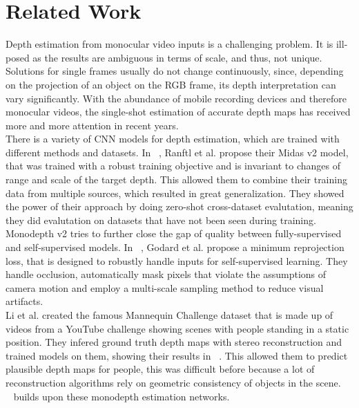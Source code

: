 \chapter{Related Work}
    Depth estimation from monocular video inputs is a challenging problem.
    It is ill-posed as the results are ambiguous in terms of scale, and thus, not unique.
    Solutions for single frames usually do not change continuously, since, depending on the projection of an object on the RGB frame, its depth interpretation can vary significantly.
    With the abundance of mobile recording devices and therefore monocular videos, the single-shot estimation of accurate depth maps has received more and more attention in recent years.\\
    There is a variety of CNN models for depth estimation, which are trained with different methods and datasets.
    In ~\cite{ranftl2020robust}, Ranftl et al. propose their Midas v2 model, that was trained with a robust training objective and is invariant to changes of range and scale of the target depth.
    This allowed them to combine their training data from multiple sources, which resulted in great generalization.
    They showed the power of their approach by doing zero-shot cross-dataset evalutation, meaning they did evalutation on datasets that have not been seen during training.\\
    Monodepth v2 tries to further close the gap of quality between fully-supervised and self-supervised models.
    In ~\cite{godard2019digging}, Godard et al. propose a minimum reprojection loss, that is designed to robustly handle inputs for self-supervised learning.
    They handle occlusion, automatically mask pixels that violate the assumptions of camera motion and employ a multi-scale sampling method to reduce visual artifacts.\\
    Li et al. created the famous Mannequin Challenge dataset that is made up of videos from a YouTube challenge showing scenes with people standing in a static position.
    They infered ground truth depth maps with stereo reconstruction and trained models on them, showing their results in ~\cite{mannequin}.
    This allowed them to predict plausible depth maps for people, this was difficult before because a lot of reconstruction algorithms rely on geometric consistency of objects in the scene.\\
    ~\cite{luo2020consistent} builds upon these monodepth estimation networks.
